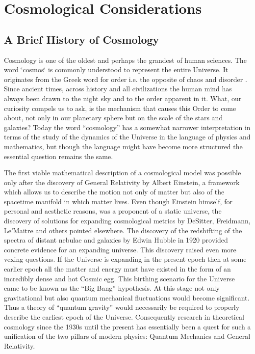 \chapter{Cosmological Considerations}

\begin{doublespace}

\section{A Brief History of Cosmology}

Cosmology is one of the oldest and perhaps the grandest of human sciences.
The word \char`\"{}cosmos\char`\"{} is commonly understood to represent
the entire Universe. It originates from the Greek word for order i.e.
the opposite of chaos and disorder \cite{Wikipedia2008Cosmology}. Since
ancient times, across history and all civilizations the human mind
has always been drawn to the night sky and to the order apparent in
it. What, our curiosity compels us to ask, is the mechanism that causes
this Order to come about, not only in our planetary sphere but on
the scale of the stars and galaxies? Today the word {}``cosmology''
has a somewhat narrower interpretation in terms of the study of the
dynamics of the Universe in the language of physics and mathematics,
but though the language might have become more structured the essential
question remains the same.

The first viable mathematical description of a cosmological model
was possible only after the discovery of General Relativity by Albert
Einstein\cite{Einstein:1920RelativityBook}, a framework which allows
us to describe the motion not only of matter but also of the spacetime
manifold in which matter lives. Even though Einstein himself, for
personal and aesthetic reasons, was a proponent of a static universe,
the discovery of solutions for expanding cosmological metrics by DeSitter,
Freidmann, Le'Maitre and others pointed elsewhere. The discovery of
the redshifting of the spectra of distant nebulae and galaxies by
Edwin Hubble in 1920\cite{Hubble:1929PNAS} provided concrete evidence
for an expanding universe. This discovery raised even more vexing
questions. If the Universe is expanding in the present epoch then
at some earlier epoch all the matter and energy must have existed
in the form of an incredibly dense and hot Cosmic egg. This birthing
scenario for the Universe came to be known as the {}``Big Bang''
hypothesis. At this stage not only gravitational but also quantum
mechanical fluctuations would become significant. Thus a theory of
{}``quantum gravity'' would necessarily be required to properly
describe the earliest epoch of the Universe. Consequently research
in theoretical cosmology since the 1930s until the present has essentially
been a quest for such a unification of the two pillars of modern physics:
Quantum Mechanics and General Relativity.


\end{doublespace}
